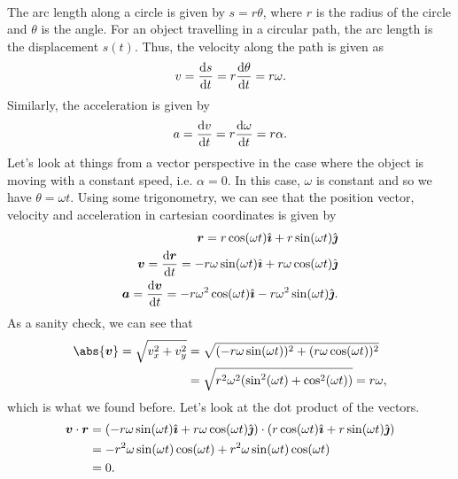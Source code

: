 \documentclass[../classical_mechanics.tex]{subfiles}
\begin{document}
        \paragraph{}
        The arc length along a circle is given by $s=r\theta$, where $r$ is the radius of the circle and $\theta$ is the angle.
        For an object travelling in a circular path, the arc length is the displacement $s(t)$.
        Thus, the velocity along the path is given as
        \begin{equation}
            v=\dv{s}{t}=r\dv{\theta}{t}=r\omega.
        \end{equation}
        Similarly, the acceleration is given by
        \begin{equation}
            a=\dv{v}{t}=r\dv{\omega}{t}=r\alpha.
        \end{equation}
        Let's look at things from a vector perspective in the case where the object is moving with a constant speed, i.e. $\alpha=0$.
        In this case, $\omega$ is constant and so we have $\theta=\omega t$.
        Using some trigonometry, we can see that the position vector, velocity and acceleration in cartesian coordinates is given by
        \begin{align}
            \vec{r}=r\cos(\omega t)\ihat+r\sin(\omega t)\jhat\\
            \vec{v}=\dv{\vec{r}}{t}=-r\omega\sin(\omega t)\ihat+r\omega\cos(\omega t)\jhat\\
            \vec{a}=\dv{\vec{v}}{t}=-r\omega^2\cos(\omega t)\ihat-r\omega^2\sin(\omega t)\jhat.
        \end{align}
        As a sanity check, we can see that
        \begin{align}
            \abs{\vec{v}}=\sqrt{v_x^2+v_y^2}&=\sqrt{(-r\omega\sin(\omega t))^2+(r\omega\cos(\omega t))^2}\\
            &=\sqrt{r^2\omega^2(\sin^2(\omega t)+\cos^2(\omega t))}=r\omega,
        \end{align}
        which is what we found before.
        Let's look at the dot product of the vectors.
        \begin{align}
            \boldsymbol{v}\cdot\boldsymbol{r}&=(-r\omega\sin(\omega t)\hat{\boldsymbol{\imath}}+r\omega\cos(\omega t)\hat{\boldsymbol{\jmath}})\cdot(r\cos(\omega t)\hat{\boldsymbol{\imath}}+r\sin(\omega t)\hat{\boldsymbol{\jmath}})\\
            &=-r^2\omega\sin(\omega t)\cos(\omega t)+r^2\omega\sin(\omega t)\cos(\omega t)\\
            &=0.
        \end{align}
\end{document}
